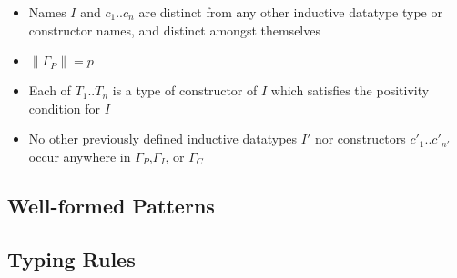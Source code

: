 \documentclass{article}
\newcommand{\lenc}[1]{\|#1\|}
\begin{document}
\begin{itemize}
  \item Names $I$ and $c_1..c_n$ are distinct from any other inductive datatype
    type or constructor names, and distinct amongst themselves
  \item $\lenc{\Gamma_P} = p$
  \item Each of $T_1..T_n$ is a type of constructor of $I$ which satisfies the
    positivity condition for $I$
  \item No other previously defined inductive datatypes $I'$ nor constructors
    $c'_1..c'_{n'}$ occur anywhere in $\Gamma_P$,$\Gamma_I$, or $\Gamma_C$
\end{itemize}

\subsection{Well-formed Patterns}

\subsection{Typing Rules}
\end{document}
